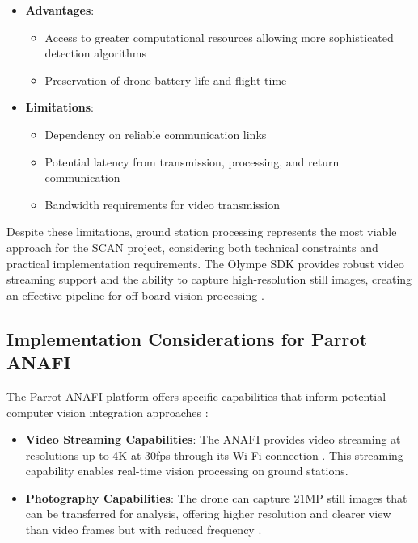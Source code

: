 \begin{itemize}
    \item \textbf{Advantages}:
    \begin{itemize}
        \item Access to greater computational resources allowing more sophisticated detection algorithms \cite{Cavaliere2019}
        \item Preservation of drone battery life and flight time \cite{AlKaff2018}
    \end{itemize}
    
    \item \textbf{Limitations}:
    \begin{itemize}
        \item Dependency on reliable communication links \cite{Chmaj2015}
        \item Potential latency from transmission, processing, and return communication \cite{Cavaliere2019}
        \item Bandwidth requirements for video transmission \cite{Yanmaz2018}
    \end{itemize}
\end{itemize}

Despite these limitations, ground station processing represents the most viable approach for the SCAN project, considering both technical constraints and practical implementation requirements. The Olympe SDK provides robust video streaming support and the ability to capture high-resolution still images, creating an effective pipeline for off-board vision processing \cite{ParrotOlympeDoc}.

\subsection{Implementation Considerations for Parrot ANAFI}

The Parrot ANAFI platform offers specific capabilities that inform potential computer vision integration approaches \cite{ParrotSDKDoc}:

\begin{itemize}
    \item \textbf{Video Streaming Capabilities}: The ANAFI provides video streaming at resolutions up to 4K at 30fps through its Wi-Fi connection \cite{ParrotANAFISpec}. This streaming capability enables real-time vision processing on ground stations.
    
    \item \textbf{Photography Capabilities}: The drone can capture 21MP still images that can be transferred for analysis, offering higher resolution and clearer view than video frames but with reduced frequency \cite{ParrotANAFISpec}.
\end{itemize}

